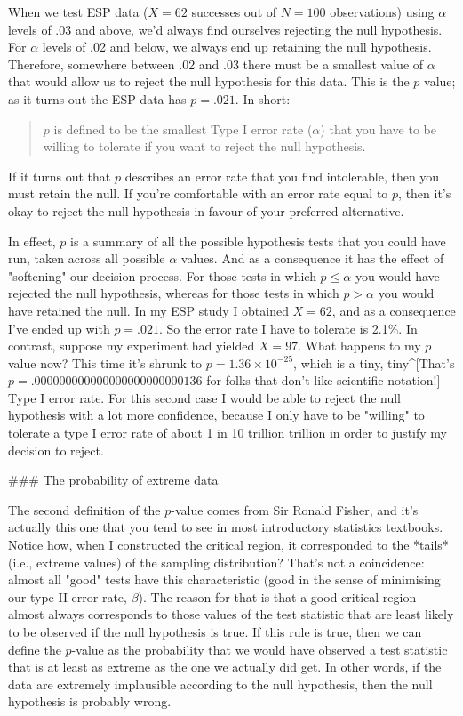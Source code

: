When we test ESP data ($X=62$ successes out of $N=100$ observations) using $\alpha$ levels of .03 and above, we'd always find ourselves rejecting the null hypothesis. For $\alpha$ levels of .02 and below, we always end up retaining the null hypothesis. Therefore, somewhere between .02 and .03 there must be a smallest value of $\alpha$ that would allow us to reject the null hypothesis for this data. This is the $p$ value; as it turns out the ESP data has $p = .021$. In short:
\begin{quote}
$p$ is defined to be the smallest Type I error rate ($\alpha$) that you have to be willing to tolerate if you want to reject the null hypothesis. 
\end{quote}
If it turns out that $p$ describes an error rate that you find intolerable, then you must retain the null. If you're comfortable with an error rate equal to $p$, then it's okay to reject the null hypothesis in favour of your preferred alternative. 

In effect, $p$ is a summary of all the possible hypothesis tests that you could have run, taken across all possible $\alpha$ values. And as a consequence it has the effect of "softening" our decision process. For those tests in which $p \leq \alpha$ you would have rejected the null hypothesis, whereas for those tests in which $p > \alpha$ you would have retained the null. In my ESP study I obtained $X=62$, and as a consequence I've ended up with $p = .021$. So the error rate I have to tolerate is 2.1\%.  In contrast, suppose my experiment had yielded $X=97$. What happens to my $p$ value now? This time it's shrunk to $p = 1.36 \times 10^{-25}$, which is a tiny, tiny^[That's $p = .000000000000000000000000136$ for folks that don't like scientific notation!] Type I error rate. For this second case I would be able to reject the null hypothesis with a lot more confidence, because I only have to be "willing" to tolerate a type I error rate of about 1 in 10 trillion trillion in order to justify my decision to reject.


### The probability of extreme data

The second definition of the $p$-value comes from Sir Ronald Fisher, and it's actually this one that you tend to see in most introductory statistics textbooks. Notice how, when I constructed the critical region, it corresponded to the *tails* (i.e., extreme values) of the sampling distribution? That's not a coincidence: almost all "good" tests have this characteristic (good in the sense of minimising our type II error rate, $\beta$). The reason for that is that a good critical region almost always corresponds to those values of the test statistic that are least likely to be observed if the null hypothesis is true. If this rule is true, then we can define the $p$-value as the probability that we would have observed a test statistic that is at least as extreme as the one we actually did get. In other words, if the data are extremely implausible according to the null hypothesis, then the null hypothesis is probably wrong.


